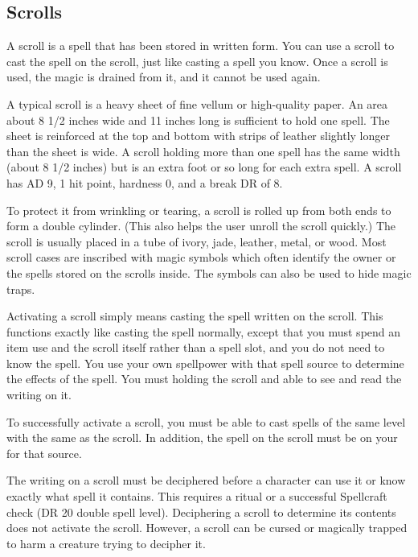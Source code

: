     \subsection{Scrolls}
        A scroll is a spell that has been stored in written form.
        You can use a scroll to cast the spell on the scroll, just like casting a spell you know.
        Once a scroll is used, the magic is drained from it, and it cannot be used again.

         A typical scroll is a heavy sheet of fine vellum or high-quality paper.
        An area about 8 1/2 inches wide and 11 inches long is sufficient to hold one spell.
        The sheet is reinforced at the top and bottom with strips of leather slightly longer than the sheet is wide.
        A scroll holding more than one spell has the same width (about 8 1/2 inches) but is an extra foot or so long for each extra spell.
        A scroll has AD 9, 1 hit point, hardness 0, and a break DR of 8.

        To protect it from wrinkling or tearing, a scroll is rolled up from both ends to form a double cylinder.
        (This also helps the user unroll the scroll quickly.) The scroll is usually placed in a tube of ivory, jade, leather, metal, or wood.
        Most scroll cases are inscribed with magic symbols which often identify the owner or the spells stored on the scrolls inside.
        The symbols can also be used to hide magic traps.

         Activating a scroll simply means casting the spell written on the scroll.
        This functions exactly like casting the spell normally, except that you must spend an item use and the scroll itself rather than a spell slot, and you do not need to know the spell.
        You use your own spellpower with that spell source to determine the effects of the spell.
        You must holding the scroll and able to see and read the writing on it.

         To successfully activate a scroll, you must be able to cast spells of the same level with the same  as the scroll.
        In addition, the spell on the scroll must be on your  for that source.

         The writing on a scroll must be deciphered before a character can use it or know exactly what spell it contains.
        This requires a  ritual or a successful Spellcraft check (DR 20 \add double spell level).
        Deciphering a scroll to determine its contents does not activate the scroll.
        However, a scroll can be cursed or magically trapped to harm a creature trying to decipher it.

